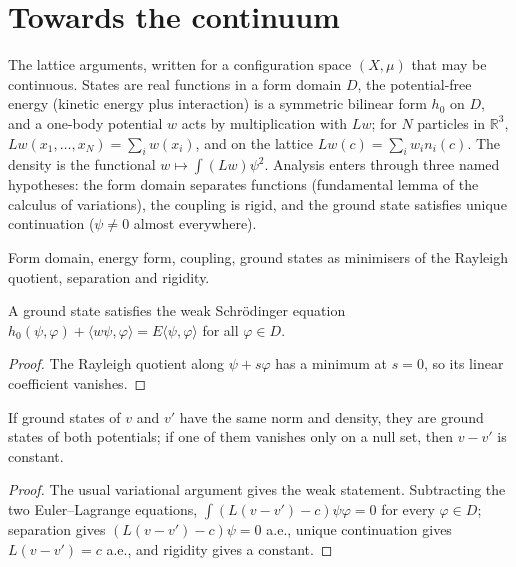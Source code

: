 \chapter{Towards the continuum}
\label{chap:continuum}

The lattice arguments, written for a configuration space $(X,\mu)$ that may be continuous. States are real functions
in a form domain $D$, the potential-free energy (kinetic energy plus interaction) is a symmetric bilinear form $h_0$ on
$D$, and a one-body potential $w$ acts by multiplication with $Lw$; for $N$ particles in $\mathbb R^3$,
$Lw(x_1,\dots,x_N)=\sum_iw(x_i)$, and on the lattice $Lw(c)=\sum_iw_in_i(c)$. The density is the functional
$w\mapsto\int(Lw)\psi^2$. Analysis enters through three named hypotheses: the form domain separates functions
(fundamental lemma of the calculus of variations), the coupling is rigid, and the ground state satisfies unique
continuation ($\psi\neq0$ almost everywhere).

\begin{definition}[Setting]
  \label{def:continuum_setting}
  \leanok
  Form domain, energy form, coupling, ground states as minimisers of the Rayleigh quotient, separation and rigidity.
\end{definition}

\begin{lemma}
  \label{lem:euler_lagrange}
  \leanok
  A ground state satisfies the weak Schr\"odinger equation $h_0(\psi,\varphi)+\langle w\psi,\varphi\rangle
  =E\langle\psi,\varphi\rangle$ for all $\varphi\in D$.
\end{lemma}
\begin{proof}
  \leanok
  The Rayleigh quotient along $\psi+s\varphi$ has a minimum at $s=0$, so its linear coefficient vanishes.
\end{proof}

\begin{theorem}
  \label{thm:hk_continuum}
  \leanok
  If ground states of $v$ and $v'$ have the same norm and density, they are ground states of both potentials; if one
  of them vanishes only on a null set, then $v-v'$ is constant.
\end{theorem}
\begin{proof}
  \leanok
  The usual variational argument gives the weak statement. Subtracting the two Euler--Lagrange equations,
  $\int(L(v-v')-c)\psi\varphi=0$ for every $\varphi\in D$; separation gives $(L(v-v')-c)\psi=0$ a.e., unique
  continuation gives $L(v-v')=c$ a.e., and rigidity gives a constant.
\end{proof}

